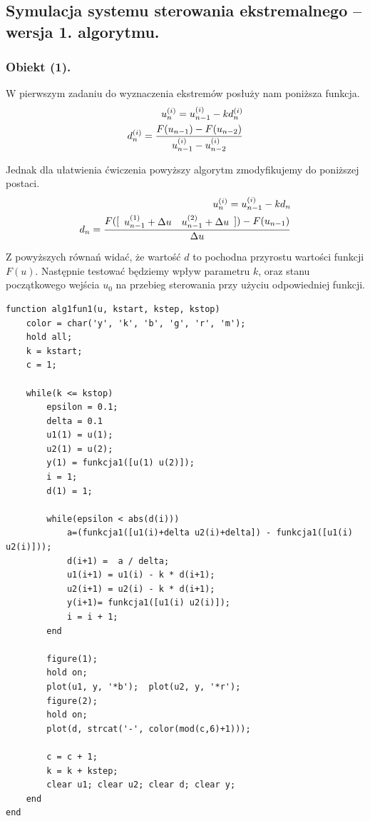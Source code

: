 \documentclass[a4paper,10pt]{article}
\begin{document}
\subsection{Symulacja systemu sterowania ekstremalnego – wersja 1. algorytmu.}

\subsubsection{Obiekt (1).}
W pierwszym zadaniu do wyznaczenia ekstremów posłuży nam poniższa funkcja.
\begin{eqnarray}
	u_n^{(i)} = u_{n-1}^{(i)}-kd_n^{(i)}\\
	d_n^{(i)} = {F(u_{n-1}) - F(u_{n-2}) \over u_{n-1}^{(i)} - u_{n-2}^{(i)}}
\end{eqnarray}

Jednak dla ułatwienia ćwiczenia powyższy algorytm zmodyfikujemy do poniższej postaci.
\begin{eqnarray}
	u_n^{(i)} = u_{n-1}^{(i)}-kd_n\\
	d_n = {F([\begin{array}{ll} u_{n-1}^{(1)} + \Delta u & u_{n-1}^{(2)} + \Delta u\end{array}]) - F(u_{n-1}) \over \Delta u}
\end{eqnarray}

Z powyższych równań widać, że wartość $d$ to pochodna przyrostu wartości funkcji $F(u)$.
Następnie testować będziemy wpływ parametru $k$, oraz stanu początkowego wejścia $u_0$ na przebieg sterowania przy użyciu odpowiedniej funkcji.
\begin{lstlisting}[caption=Funkcja testująca algorytm 1 dla obiektu 1.]
function alg1fun1(u, kstart, kstep, kstop)
    color = char('y', 'k', 'b', 'g', 'r', 'm');
    hold all;
    k = kstart;
    c = 1;
    
    while(k <= kstop)
        epsilon = 0.1;
        delta = 0.1
        u1(1) = u(1);
        u2(1) = u(2);
        y(1) = funkcja1([u(1) u(2)]);
        i = 1;
        d(1) = 1;
        
        while(epsilon < abs(d(i)))
            a=(funkcja1([u1(i)+delta u2(i)+delta]) - funkcja1([u1(i) u2(i)]));
            d(i+1) =  a / delta;
            u1(i+1) = u1(i) - k * d(i+1);
            u2(i+1) = u2(i) - k * d(i+1);
            y(i+1)= funkcja1([u1(i) u2(i)]);
            i = i + 1;
        end

        figure(1);
        hold on;
        plot(u1, y, '*b');  plot(u2, y, '*r');
        figure(2);
        hold on;
        plot(d, strcat('-', color(mod(c,6)+1)));
        
        c = c + 1;
        k = k + kstep;
        clear u1; clear u2; clear d; clear y;
    end
end
\end{lstlisting}
\end{document}
